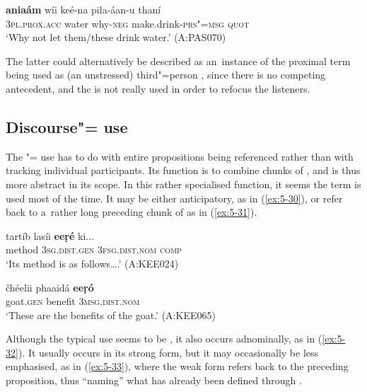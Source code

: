 \begin{exe}
\ex
\label{ex:5-29}
\gll \textbf{aniaám} wíi keé-na pila-áan-u thaní \\
\textsc{3pl.prox.acc} water why-\textsc{neg} make.drink-\textsc{prs"=msg} \textsc{quot}\\
\glt `Why not let them/these drink water.' (A:PAS070)
\end{exe}
The latter could alternatively be described as an~instance of the proximal term being used as (an unstressed) third"=person , since there is no competing antecedent, and the  is not really used in order to refocus the listeners.

\subsection{Discourse"= use}
\label{subsec:5-2-5}

The "= use has to do with entire propositions being referenced rather than with tracking individual  participants. Its function is to combine chunks of  \citep[432]{diessel2006}, and is thus more abstract in its scope. In this rather specialised function, it seems the  term is used most of the time. It may be either anticipatory, as in (\ref{ex:5-30}), or refer back to a~rather long preceding chunk of  as in (\ref{ex:5-31}).

\begin{exe}
\ex
\label{ex:5-30}
\gll tartíb lasíi \textbf{eeṛé} ki...\\
method \textsc{3sg}.\textsc{dist.gen} \textsc{3fsg}.\textsc{dist.nom} \textsc{comp}\\
\glt `Its method is as follows{\ldots}.' (A:KEE024)

\ex
\label{ex:5-31}
\gll čhéelii phaaidá \textbf{eeṛó}\\
goat.\textsc{gen} benefit \textsc{3msg}.\textsc{dist.nom}\\
\glt `These are the benefits of the goat.' (A:KEE065)
\end{exe}

Although the typical use seems to be , it also occurs adnominally, as in (\ref{ex:5-32}). It usually occurs in its strong form, but it may occasionally be less emphasised, as in (\ref{ex:5-33}), where the weak form refers back to the preceding proposition, thus ``naming'' what has already been defined through .

